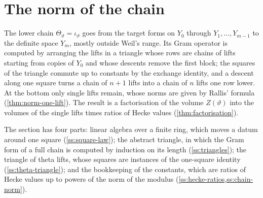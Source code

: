 \section{The norm of the chain}\label{sec:chain-norm}

The lower chain $\Theta_\vartheta=\iota_\vartheta$ goes from the target forms on $Y_0$ through $Y_1,\dots,Y_{m-1}$ to the definite space $Y_m$, mostly outside Weil's range. Its
Gram operator is computed by arranging the lifts in a triangle whose rows are chains of lifts starting from copies of $Y_0$ and whose descents remove the first
block; the squares of the triangle commute up to constants by the exchange identity, and a descent along one square turns a chain of $n+1$ lifts into a chain of
$n$ lifts one row lower. At the bottom only single lifts remain, whose norms are given by Rallis' formula (\cref{thm:norm-one-lift}). The result is a factorisation
of the volume $Z(\vartheta)$ into the volumes of the single lifts times ratios of Hecke values (\cref{thm:factorisation}).

The section has four parts: linear algebra over a finite ring, which moves a datum around one square (\cref{ss:square-law}); the abstract triangle, in which the Gram form of a full chain is computed
by induction on its length (\cref{ss:triangles}); the triangle of theta lifts, whose squares are instances of the one-square identity (\cref{ss:theta-triangle}); and the bookkeeping of the constants, which
are ratios of Hecke values up to powers of the norm of the modulus (\cref{ss:hecke-ratios,ss:chain-norm}).

